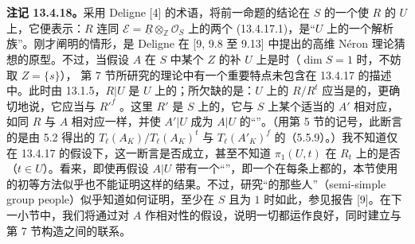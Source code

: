 \textbf{注记 13.4.18。}采用 Deligne [4] 的术语，将前一命题的结论在 $S$ 的一个使 $R$ 的 $U$ 上，它便表示：$R$ 连同 $\mathscr E=\underline R\otimes_{\mathbb Z}\mathcal O_S$ 上的两个 (13.4.17.1)，是“$U$ 上的一个解析族”。刚才阐明的情形，是 Deligne 在 [9, 9.8 至 9.13] 中提出的高维 Néron 理论猜想的原型。不过，当假设 $A$ 在 $S$ 中某个 $Z$ 的补 $U$ 上是时（$\dim S=1$ 时，不妨取 $Z=\{s\}$），
第 7 节所研究的理论中有一个重要特点未包含在 13.4.17 的描述中。此时由 13.1.5，$R|U$ 是 $U$ 上的；所欠缺的是：$U$ 上的 $R/R^t$ 应当是的，更确切地说，它应当与 $R'^f$ 。这里 $R'$ 是 $S$ 上的，它与 $S$ 上某个适当的 $A'$ 相对应，如同 $R$ 与 $A$ 相对应一样，并使 $A'|U$ 成为 $A|U$ 的“”。（用第 5 节的记号，此断言的是由 5.2 得出的 $T_\ell(A_K)/T_\ell(A_K)^t$ 与 $T_\ell(A'_K)^f$ 的（5.5.9）。）我不知道仅在 13.4.17 的假设下，这一断言是否成立，甚至不知道 $\pi_1(U,t)$ 在 $R_t$ 上的是否（$t\in U$）。看来，即使再假设 $A|U$ 带有一个“”，即一个在每条上都的，本节使用的初等方法似乎也不能证明这样的结果。不过，研究“的那些人”（semi-simple group people）似乎知道如何证明，至少在 $S$ 且为 $1$ 时如此，参见报告 [9]。在下一小节中，我们将通过对 $A$ 作相对性的假设，说明一切都运作良好，同时建立与第 7 节构造之间的联系。

